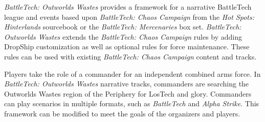 \emph{BattleTech: Outworlds Wastes} provides a framework for a narrative BattleTech league and events based upon \emph{BattleTech: Chaos Campaign} from the \emph{Hot Spots: Hinterlands} sourcebook or the \emph{BattleTech: Mercenaries} box set.
\emph{BattleTech: Outworlds Wastes} extends the \emph{BattleTech: Chaos Campaign} rules by adding DropShip customization as well as optional rules for force maintenance.
These rules can be used with existing \emph{BattleTech: Chaos Campaign} content and tracks.

Players take the role of a commander for an independent combined arms force.
In \emph{BattleTech: Outworlds Wastes} narrative tracks, commanders are searching the Outworlds Wastes region of the Periphery for LosTech and glory.
Commanders can play scenarios in multiple formats, such as \emph{BattleTech} and \emph{Alpha Strike}.
This framework can be modified to meet the goals of the organizers and players.

